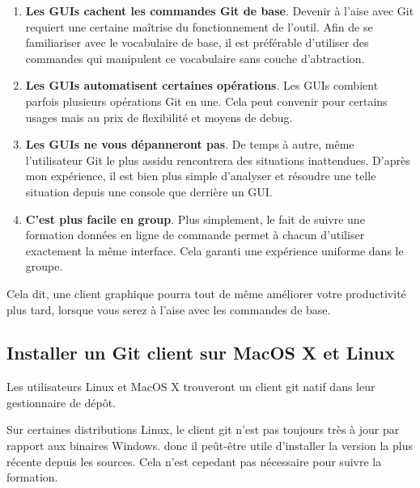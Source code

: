 \documentclass{../../common/tufte-latex/tufte-handout}
\begin{document}
\begin{enumerate} 
 \item{\textbf{Les GUIs cachent les commandes Git de base}. Devenir à l'aise avec Git requiert une certaine maîtrise du fonctionnement de l'outil. Afin de se familiariser avec le vocabulaire de base, il est préférable d'utiliser des commandes qui manipulent ce vocabulaire sans couche d'abtraction.}
 \item{\textbf{Les GUIs automatisent certaines opérations}. 
 Les GUIs combient parfois plusieurs opérations Git en une. Cela peut convenir pour certains usages mais au prix de flexibilité et moyens de debug.}
 \item{\textbf{Les GUIs ne vous dépanneront pas}. 
 De temps à autre, même l'utilisateur Git le plus assidu rencontrera des situations inattendues. D'après mon expérience, il est bien plus simple d'analyser et résoudre une telle situation depuis une console que derrière un GUI.}
 \item{\textbf{C'est plus facile en group}. Plus simplement, le fait de suivre une formation données en ligne de commande permet à chacun d'utiliser exactement la même interface. Cela garanti une expérience uniforme dans le groupe.}
\end{enumerate}

Cela dit, une client graphique pourra tout de même améliorer votre productivité plus tard, lorsque vous serez à l'aise avec les commandes de base.

\subsection{Installer un Git client sur MacOS X et Linux}

Les utilisateurs Linux et MacOS X trouveront un client git natif dans leur gestionnaire de dépôt.

Sur certaines distributions Linux, le client git n'est pas toujours très à jour par rapport aux binaires Windows.  donc il peût-être utile d'installer la version la plus récente depuis les sources. Cela n'est cepedant pas nécessaire pour suivre la formation.
\end{document}
